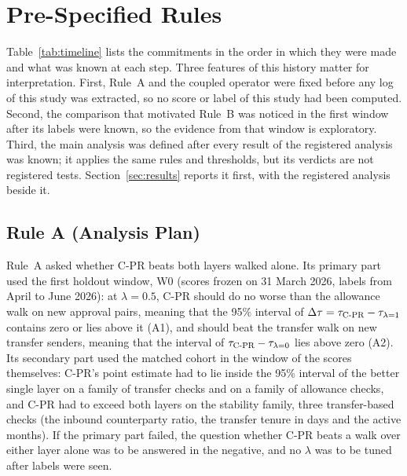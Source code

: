 \documentclass{ieeeaccess}
\newcommand{\cpr}{\mbox{C-PR}}
\begin{document}


\section{Pre-Specified Rules}
\label{sec:protocol}

Table~\ref{tab:timeline} lists the commitments in the order in which they were made and what was known at each step. Three features of this history matter for interpretation. First, Rule~A and the coupled operator were fixed before any log of this study was extracted, so no score or label of this study had been computed. Second, the comparison that motivated Rule~B was noticed in the first window after its labels were known, so the evidence from that window is exploratory. Third, the main analysis was defined after every result of the registered analysis was known; it applies the same rules and thresholds, but its verdicts are not registered tests. Section~\ref{sec:results} reports it first, with the registered analysis beside it.



\subsection{Rule A (Analysis Plan)}
Rule~A asked whether \cpr{} beats both layers walked alone. Its primary part used the first holdout window, W0 (scores frozen on 31 March 2026, labels from April to June 2026): at $\lambda=0.5$, \cpr{} should do no worse than the allowance walk on new approval pairs, meaning that the 95\% interval of $\Delta\tau=\tau_{\text{\cpr{}}}-\tau_{\lambda=1}$ contains zero or lies above it (A1), and should beat the transfer walk on new transfer senders, meaning that the interval of $\tau_{\text{\cpr{}}}-\tau_{\lambda=0}$ lies above zero (A2). Its secondary part used the matched cohort in the window of the scores themselves: \cpr{}'s point estimate had to lie inside the 95\% interval of the better single layer on a family of transfer checks and on a family of allowance checks, and \cpr{} had to exceed both layers on the stability family, three transfer-based checks (the inbound counterparty ratio, the transfer tenure in days and the active months). If the primary part failed, the question whether \cpr{} beats a walk over either layer alone was to be answered in the negative, and no $\lambda$ was to be tuned after labels were seen.
\end{document}
